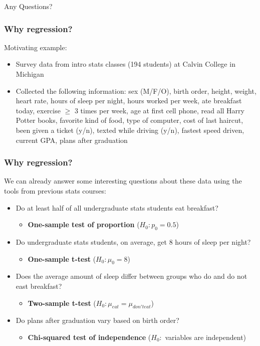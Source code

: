 \documentclass[12pt, 
hyperref={colorlinks=true, linkcolor=blue, urlcolor=cyan}]{beamer}
\begin{document}
\begin{frame}
\center \Large Any Questions?
\end{frame}

\begin{frame}
\frametitle{Why regression?}
Motivating example:
\begin{itemize}  %
\item Survey data from intro stats classes (194 students) at Calvin College in Michigan
\item Collected the following information: sex (M/F/O), birth order, height, weight, heart rate, hours of sleep per night, hours worked per week, ate breakfast today, exercise $\ge$ 3 times per week, age at first cell phone, read all Harry Potter books, favorite kind of food, type of computer, cost of last haircut, been given a ticket (y/n), texted while driving (y/n), fastest speed driven, current GPA, plans after graduation
\end{itemize}
\end{frame}

\begin{frame}
\frametitle{Why regression?}
We can already answer some interesting questions about these data using the tools from previous stats courses: \vspace{-0.3cm}
\begin{itemize} %
\item Do at least half of all undergraduate stats students eat breakfast?
	\begin{itemize}
	\item \textbf{One-sample test of proportion} ($H_0: p_0 = 0.5$)
	\end{itemize}
\item Do undergraduate stats students, on average, get 8 hours of sleep per night?
	\begin{itemize}
	\item \textbf{One-sample t-test} ($H_0: \mu_0 = 8$)
	\end{itemize}
\item Does the average amount of sleep differ between groups who do and do not east breakfast?
	\begin{itemize}
	\item \textbf{Two-sample t-test} ($H_0: \mu_{eat} = \mu_{don't eat}$)
	\end{itemize}
\item Do plans after graduation vary based on birth order?
	\begin{itemize}
	\item \textbf{Chi-squared test of independence} ($H_0:$ variables are independent)
	\end{itemize}
\end{itemize}
\end{frame}
\end{document}
